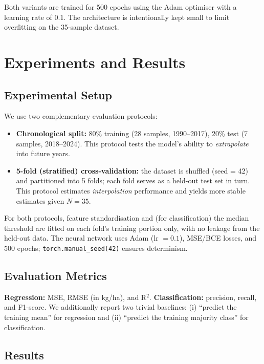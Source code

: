 \documentclass[conference]{IEEEtran}
\begin{document}
Both variants are trained for 500 epochs using the Adam optimiser with a learning rate of $0.1$. The architecture is intentionally kept small to limit overfitting on the 35-sample dataset.

\section{Experiments and Results}

\subsection{Experimental Setup}
We use two complementary evaluation protocols:
\begin{itemize}
  \item \textbf{Chronological split:} 80\% training (28 samples, 1990--2017), 20\% test (7 samples, 2018--2024). This protocol tests the model's ability to \emph{extrapolate} into future years.
  \item \textbf{5-fold (stratified) cross-validation:} the dataset is shuffled (seed = 42) and partitioned into 5 folds; each fold serves as a held-out test set in turn. This protocol estimates \emph{interpolation} performance and yields more stable estimates given $N = 35$.
\end{itemize}
For both protocols, feature standardisation and (for classification) the median threshold are fitted on each fold's training portion only, with no leakage from the held-out data. The neural network uses Adam (lr $= 0.1$), MSE/BCE losses, and 500 epochs; \texttt{torch.manual\_seed(42)} ensures determinism.

\subsection{Evaluation Metrics}
\textbf{Regression:} MSE, RMSE (in kg/ha), and R$^2$. \textbf{Classification:} precision, recall, and F1-score. We additionally report two trivial baselines: (i) ``predict the training mean'' for regression and (ii) ``predict the training majority class'' for classification.

\subsection{Results}
\end{document}
